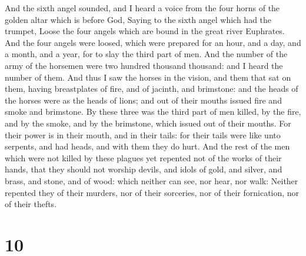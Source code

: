  And the sixth angel sounded, and I heard a voice from the
four horns of the golden altar which is before God,  Saying
to the sixth angel which had the trumpet, Loose the four angels which
are bound in the great river Euphrates.  And the four
angels were loosed, which were prepared for an hour, and a day, and a
month, and a year, for to slay the third part of men.  And
the number of the army of the horsemen were two hundred thousand
thousand: and I heard the number of them.  And thus I saw
the horses in the vision, and them that sat on them, having breastplates
of fire, and of jacinth, and brimstone: and the heads of the horses were
as the heads of lions; and out of their mouths issued fire and smoke and
brimstone.  By these three was the third part of men
killed, by the fire, and by the smoke, and by the brimstone, which
issued out of their mouths.  For their power is in their
mouth, and in their tails: for their tails were like unto serpents, and
had heads, and with them they do hurt.  And the rest of the
men which were not killed by these plagues yet repented not of the works
of their hands, that they should not worship devils, and idols of gold,
and silver, and brass, and stone, and of wood: which neither can see,
nor hear, nor walk:  Neither repented they of their
murders, nor of their sorceries, nor of their fornication, nor of their
thefts.

\hypertarget{section-9}{%
\section{10}\label{section-9}}

